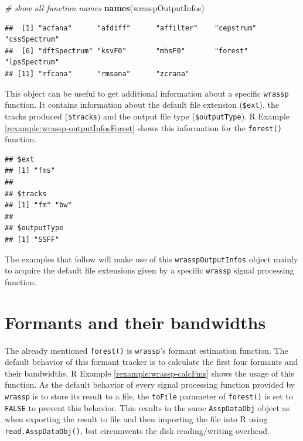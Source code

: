 \documentclass[]{book}
\newenvironment{Shaded}{\begin{snugshade}}{\end{snugshade}}
\newcommand{\CommentTok}[1]{\textcolor[rgb]{0.56,0.35,0.01}{\textit{#1}}}
\newcommand{\KeywordTok}[1]{\textcolor[rgb]{0.13,0.29,0.53}{\textbf{#1}}}
\newcommand{\NormalTok}[1]{#1}
\newcommand{\OperatorTok}[1]{\textcolor[rgb]{0.81,0.36,0.00}{\textbf{#1}}}
\theoremstyle{definition}
\theoremstyle{definition}
\theoremstyle{definition}
\theoremstyle{remark}
\begin{document}
\begin{Shaded}
\begin{Highlighting}[]
\CommentTok{# show all function names}
\KeywordTok{names}\NormalTok{(wrasspOutputInfos)}
\end{Highlighting}
\end{Shaded}

\begin{verbatim}
##  [1] "acfana"      "afdiff"      "affilter"    "cepstrum"    "cssSpectrum"
##  [6] "dftSpectrum" "ksvF0"       "mhsF0"       "forest"      "lpsSpectrum"
## [11] "rfcana"      "rmsana"      "zcrana"
\end{verbatim}

This object can be useful to get additional information about a specific
\texttt{wrassp} function. It contains information about the default file
extension (\texttt{\$ext}), the tracks produced (\texttt{\$tracks}) and
the output file type (\texttt{\$outputType}). R Example
\ref{rexample:wrassp-outputInfosForest} shows this information for the
\texttt{forest()} function.

\begin{Shaded}
\end{Shaded}

\begin{verbatim}
## $ext
## [1] "fms"
## 
## $tracks
## [1] "fm" "bw"
## 
## $outputType
## [1] "SSFF"
\end{verbatim}

The examples that follow will make use of this
\texttt{wrasspOutputInfos} object mainly to acquire the default file
extensions given by a specific \texttt{wrassp} signal processing
function.

\hypertarget{subsec:wrassp-formants}{%
\section{Formants and their bandwidths}\label{subsec:wrassp-formants}}

The already mentioned \texttt{forest()} is \texttt{wrassp}'s formant
estimation function. The default behavior of this formant tracker is to
calculate the first four formants and their bandwidths. R Example
\ref{rexample:wrassp-calcFms} shows the usage of this function. As the
default behavior of every signal processing function provided by
\texttt{wrassp} is to store its result to a file, the \texttt{toFile}
parameter of \texttt{forest()} is set to \texttt{FALSE} to prevent this
behavior. This results in the same \texttt{AsspDataObj} object as when
exporting the result to file and then importing the file into R using
\texttt{read.AsspDataObj()}, but circumvents the disk reading/writing
overhead.
\end{document}
